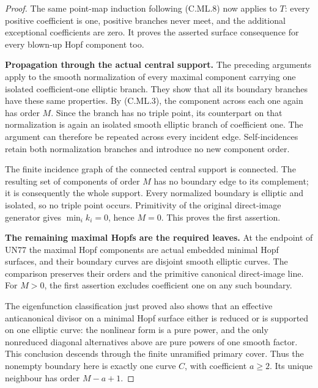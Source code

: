 \begin{proof}
The same point-map induction following (C.ML.8)
now applies to \(T\): every positive coefficient
is one, positive branches never meet, and the
additional exceptional coefficients are zero.
It proves the asserted surface consequence for
every blown-up Hopf component too.

\par\medskip\noindent\textbf{Propagation through the actual central support.}
The preceding arguments apply to the smooth
normalization of every maximal component carrying
one isolated coefficient-one elliptic branch.
They show that all its boundary branches have
these same properties. By (C.ML.3), the component
across each one again has order \(M\). Since the
branch has no triple point, its counterpart on
that normalization is again an isolated smooth
elliptic branch of coefficient one. The argument
can therefore be repeated across every incident
edge. Self-incidences retain both normalization
branches and introduce no new component order.

The finite incidence graph of the connected
central support is connected. The resulting
set of components of order \(M\) has no boundary
edge to its complement; it is consequently the
whole support. Every normalized boundary is
elliptic and isolated, so no triple point occurs.
Primitivity of the original direct-image generator
gives \(\min_i k_i=0\), hence \(M=0\).
This proves the first assertion.

\par\medskip\noindent\textbf{The remaining maximal Hopfs are the required leaves.}
At the endpoint of UN77 the maximal Hopf components
are actual embedded minimal Hopf surfaces, and
their boundary curves are disjoint smooth elliptic
curves. The comparison preserves their orders and
the primitive canonical direct-image line. For
\(M>0\), the first assertion excludes coefficient
one on any such boundary.

The eigenfunction classification just proved
also shows that an effective anticanonical divisor
on a minimal Hopf surface either is reduced or
is supported on one elliptic curve: the nonlinear
form is a pure power, and the only nonreduced
diagonal alternatives above are pure powers of
one smooth factor. This conclusion descends
through the finite unramified primary cover.
Thus the nonempty boundary here is exactly one
curve \(C\), with coefficient \(a\ge2\).
Its unique neighbour has order \(M-a+1\).


\end{proof}

